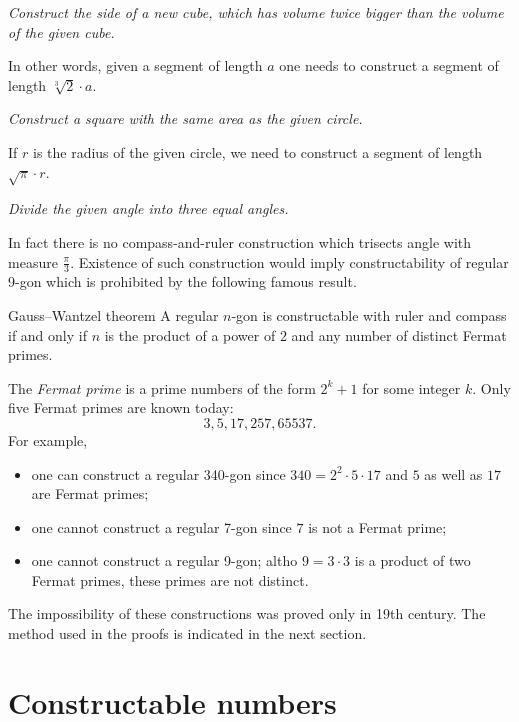  {\it Construct the side of a new cube, 
which has volume twice bigger than the volume of the given cube.} 

\medskip

In other words, 
given a segment of length $a$
one needs to construct a segment of length $\sqrt[3]{2}\cdot a$.

 {\it Construct a square with the same area as the given circle.} 

\medskip

If $r$ is the radius of the given circle, we need to construct a segment of length $\sqrt{\pi}\cdot r$. 

{\it Divide the given angle into three equal angles.}

\medskip

In fact there is no compass-and-ruler construction which trisects angle with measure $\tfrac\pi3$. 
Existence of such construction would imply constructability of regular 9-gon which is prohibited by the following famous result.

\begin{thm}{Gauss--Wantzel theorem}
A regular $n$-gon is constructable with ruler and compass 
if and only if 
$n$ is the product of a power of $2$ and any number of distinct Fermat primes.
\end{thm}

The \emph{Fermat prime} is a prime numbers of the form $2^k+1$ for some integer $k$.
Only five Fermat primes are known  today:
$$3, 5, 17, 257, 65537.$$
For example, 
\begin{itemize}
\item one can construct a regular 340-gon since $340=2^2\cdot 5\cdot 17$ and $5$ as well as $17$ are Fermat primes;
\item one cannot construct a regular 7-gon since $7$ is not a Fermat prime;
\item one cannot construct a regular 9-gon; 
altho $9=3\cdot 3$ is a product of two Fermat primes, 
these primes are not distinct.
\end{itemize}

\medskip

The impossibility of these constructions 
was proved only in 19th century.
The method used in the proofs is indicated in the next section.

\section*{Constructable numbers}

